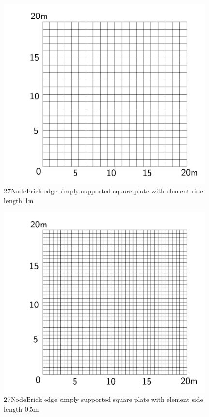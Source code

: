 \documentclass[fleqn,11pt]{article}
\begin{document}
\newpage

\begin{figure}[H]
  \centering
  \includegraphics[width=11cm]{../Figure-files/square_plate4.pdf}
  \caption{27NodeBrick edge simply supported square plate with element side length 1m }
  \label{fig 27NodeBrick edges simply supported square plate with element side length 1m }
\end{figure}


\begin{figure}[H]
  \centering
  \includegraphics[width=11cm]{../Figure-files/square_plate5.pdf}
  \caption{27NodeBrick edge simply supported square plate with element side length 0.5m }
  \label{fig 27NodeBrick edges simply supported square plate with element side length 0.5m }
\end{figure}
\end{document}
